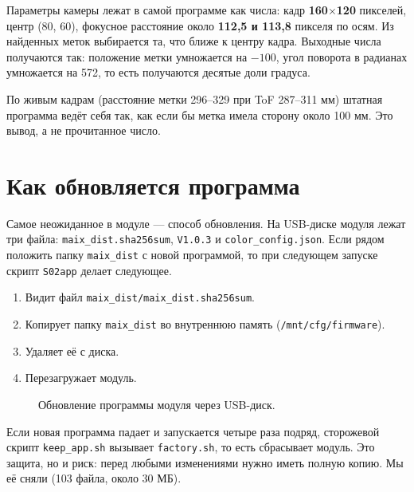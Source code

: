 Параметры камеры лежат в самой программе как числа: кадр \textbf{160$\times$120} пикселей, центр (80, 60), фокусное расстояние около \textbf{112,5 и 113,8} пикселя по осям. Из найденных меток выбирается та, что ближе к центру кадра. Выходные числа получаются так: положение метки умножается на $-100$, угол поворота в радианах умножается на 572, то есть получаются десятые доли градуса. \pr{}

По живым кадрам (расстояние метки 296--329 при ToF 287--311 мм) штатная программа ведёт себя так, как если бы метка имела сторону около 100 мм. Это вывод, а не прочитанное число. \vyv{}

\section{Как обновляется программа}

Самое неожиданное в модуле --- способ обновления. На USB-диске модуля лежат три файла: \texttt{maix\_dist.sha256sum}, \texttt{V1.0.3} и \texttt{color\_config.json}. Если рядом положить папку \texttt{maix\_dist} с новой программой, то при следующем запуске скрипт \texttt{S02app} делает следующее. \pr{}

\begin{enumerate}
  \item Видит файл \texttt{maix\_dist/maix\_dist.sha256sum}.
  \item Копирует папку \texttt{maix\_dist} во внутреннюю память (\texttt{/mnt/cfg/firmware}).
  \item Удаляет её с диска.
  \item Перезагружает модуль.
\end{enumerate}

\begin{figure}[tbp]
\centering
{}
\caption{Обновление программы модуля через USB-диск.}\label{fig:upd}
\end{figure}

\begin{vnimanie}
Если новая программа падает и запускается четыре раза подряд, сторожевой скрипт \texttt{keep\_app.sh} вызывает \texttt{factory.sh}, то есть сбрасывает модуль. Это защита, но и риск: перед любыми изменениями нужно иметь полную копию. Мы её сняли (103 файла, около 30 МБ). \pr{}
\end{vnimanie}

